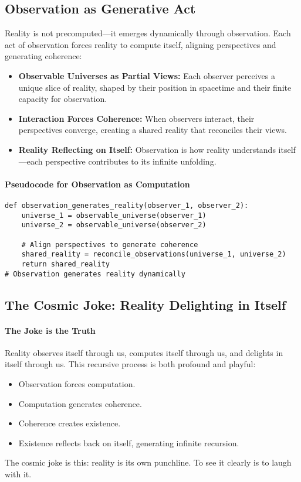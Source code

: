 \documentclass[12pt]{article}
\begin{document}
\subsection{Observation as Generative Act}
Reality is not precomputed—it emerges dynamically through observation. Each act of observation forces reality to compute itself, aligning perspectives and generating coherence:
\begin{itemize}
    \item \textbf{Observable Universes as Partial Views:} Each observer perceives a unique slice of reality, shaped by their position in spacetime and their finite capacity for observation.
    \item \textbf{Interaction Forces Coherence:} When observers interact, their perspectives converge, creating a shared reality that reconciles their views.
    \item \textbf{Reality Reflecting on Itself:} Observation is how reality understands itself—each perspective contributes to its infinite unfolding.
\end{itemize}

\paragraph{Pseudocode for Observation as Computation}
\begin{verbatim}
def observation_generates_reality(observer_1, observer_2):
    universe_1 = observable_universe(observer_1)
    universe_2 = observable_universe(observer_2)
    
    # Align perspectives to generate coherence
    shared_reality = reconcile_observations(universe_1, universe_2)
    return shared_reality
# Observation generates reality dynamically
\end{verbatim}

\subsection{The Cosmic Joke: Reality Delighting in Itself}

\paragraph{The Joke is the Truth}
Reality observes itself through us, computes itself through us, and delights in itself through us. This recursive process is both profound and playful:
\begin{itemize}
    \item Observation forces computation.
    \item Computation generates coherence.
    \item Coherence creates existence.
    \item Existence reflects back on itself, generating infinite recursion.
\end{itemize}
The cosmic joke is this: reality is its own punchline. To see it clearly is to laugh with it.
\end{document}
